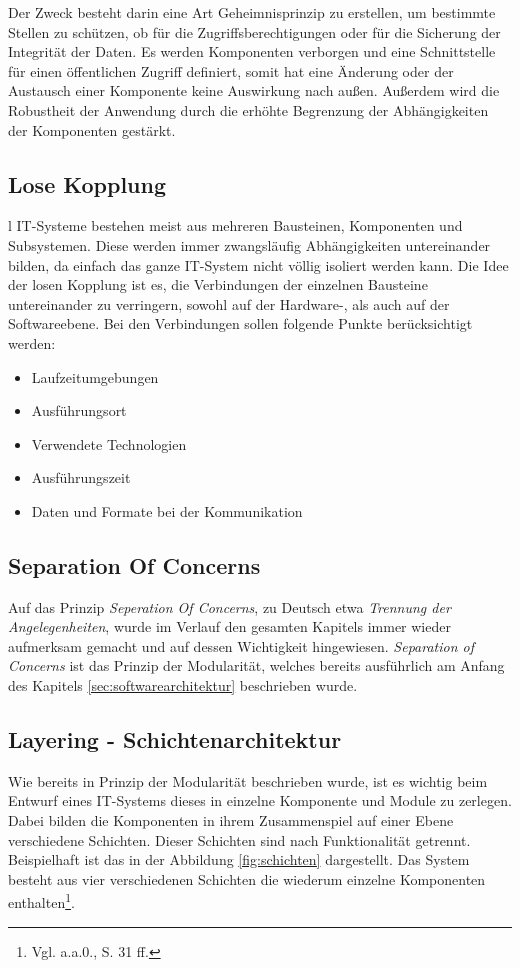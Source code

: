 Der Zweck besteht darin eine Art Geheimnisprinzip zu erstellen, um bestimmte Stellen zu schützen, ob für die Zugriffsberechtigungen oder für die Sicherung der Integrität der Daten. Es werden Komponenten verborgen und eine Schnittstelle für einen öffentlichen Zugriff definiert, somit hat eine Änderung oder der Austausch einer Komponente keine Auswirkung nach außen. Außerdem wird die Robustheit der Anwendung durch die erhöhte Begrenzung der Abhängigkeiten der Komponenten gestärkt\autocite[Vgl.][21\psq]{gmodse}.

\subsection*{Lose Kopplung}
l
\ac{IT}-Systeme bestehen meist aus mehreren Bausteinen, Komponenten und Subsystemen. Diese werden immer zwangsläufig Abhängigkeiten untereinander bilden, da einfach das ganze \ac{IT}-System nicht völlig isoliert werden kann. Die Idee der losen Kopplung ist es, die Verbindungen der einzelnen Bausteine untereinander zu verringern, sowohl auf der Hardware-, als auch auf der Softwareebene. Bei den Verbindungen sollen folgende Punkte berücksichtigt werden\autocite[Vgl.][25\psqq]{gmodse}:

\begin{itemize}
\item Laufzeitumgebungen
\item Ausführungsort
\item Verwendete Technologien
\item Ausführungszeit
\item Daten und Formate bei der Kommunikation
\end{itemize}

\subsection*{Separation Of Concerns}

Auf das Prinzip \textit{Seperation Of Concerns}, zu Deutsch etwa \textit{Trennung der Angelegenheiten}, wurde im Verlauf den gesamten Kapitels immer wieder aufmerksam gemacht und auf dessen Wichtigkeit hingewiesen. \textit{Separation of Concerns} ist das Prinzip der Modularität, welches bereits ausführlich am Anfang des Kapitels \ref{sec:softwarearchitektur} beschrieben wurde.

\subsection*{Layering - Schichtenarchitektur\label{sec:layering}}
Wie bereits in Prinzip der Modularität beschrieben wurde, ist es wichtig beim Entwurf eines \ac{IT}-Systems dieses in einzelne Komponente und Module zu zerlegen. Dabei bilden die Komponenten in ihrem Zusammenspiel auf einer Ebene verschiedene Schichten. Dieser Schichten sind nach Funktionalität getrennt. Beispielhaft ist das in der Abbildung \ref{fig:schichten} dargestellt. Das System besteht aus vier verschiedenen Schichten die wiederum einzelne Komponenten enthalten\footnote{Vgl. a.a.0., S. 31 ff.}.

